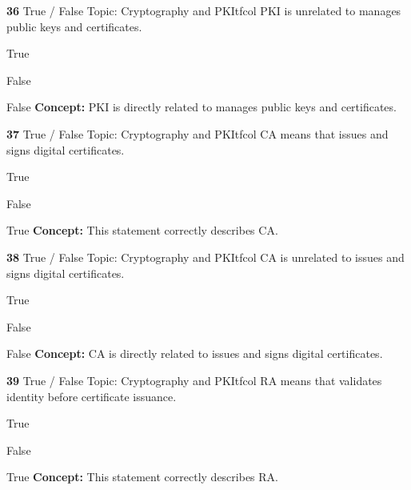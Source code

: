 \documentclass[10pt,a4paper]{article}
\begin{document}
\begin{qcard}{\color{white}\textbf{36} \hfill \small True / False \textbar{} Topic: Cryptography and PKI}{tfcol}
PKI is unrelated to manages public keys and certificates.

\begin{qoptions}
\item True
\item False
\end{qoptions}
\begin{explainbox}{False}
\textbf{Concept:} PKI is directly related to manages public keys and certificates.
\end{explainbox}
\end{qcard}

\begin{qcard}{\color{white}\textbf{37} \hfill \small True / False \textbar{} Topic: Cryptography and PKI}{tfcol}
CA means that issues and signs digital certificates.

\begin{qoptions}
\item True
\item False
\end{qoptions}
\begin{explainbox}{True}
\textbf{Concept:} This statement correctly describes CA.
\end{explainbox}
\end{qcard}

\begin{qcard}{\color{white}\textbf{38} \hfill \small True / False \textbar{} Topic: Cryptography and PKI}{tfcol}
CA is unrelated to issues and signs digital certificates.

\begin{qoptions}
\item True
\item False
\end{qoptions}
\begin{explainbox}{False}
\textbf{Concept:} CA is directly related to issues and signs digital certificates.
\end{explainbox}
\end{qcard}

\begin{qcard}{\color{white}\textbf{39} \hfill \small True / False \textbar{} Topic: Cryptography and PKI}{tfcol}
RA means that validates identity before certificate issuance.

\begin{qoptions}
\item True
\item False
\end{qoptions}
\begin{explainbox}{True}
\textbf{Concept:} This statement correctly describes RA.
\end{explainbox}
\end{qcard}
\end{document}
